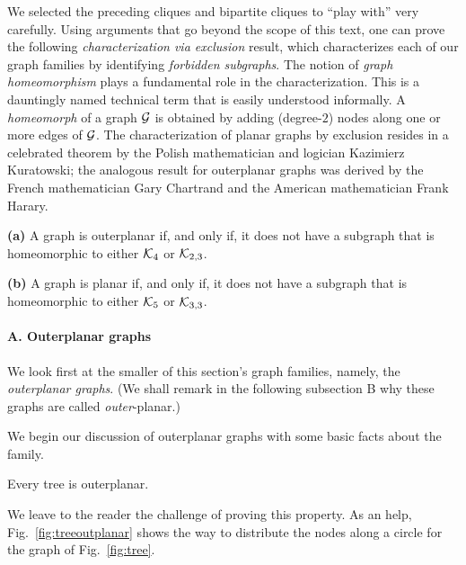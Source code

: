 We selected the preceding cliques and bipartite cliques to ``play
with'' very carefully.  Using arguments that go beyond the scope of
this text, one can prove the following {\em characterization via
  exclusion} result, which characterizes each of our graph families by
identifying {\it forbidden subgraphs}.  
 The
notion of {\it graph homeomorphism} plays a fundamental role in
 the characterization.  This is a
dauntingly named technical term that is easily understood informally.
A {\it homeomorph}  of a graph $\mbox{$\cal G$}$ is
obtained by adding (degree-$2$) nodes along one or more edges of $\mbox{$\cal G$}$.
The characterization of planar graphs by exclusion resides in a
celebrated theorem by the Polish mathematician and logician Kazimierz
Kuratowski;  the analogous result for
outerplanar graphs was derived by the French mathematician Gary
Chartrand  and the American mathematician Frank
Harary. 

\begin{theorem}
\label{thm:planar+outerplanar-exclusion}
{\bf (a)} {\rm \cite{ChartrandB67}}
A graph is outerplanar if, and only if, it does not have a subgraph
that is homeomorphic to either $\mbox{$\cal K$}_4$ or $\mbox{$\cal K$}_{2,3}$.

{\bf (b)} {\rm \cite{Kuratowski30}}
A graph is planar if, and only if, it does not have a subgraph
that is homeomorphic to either $\mbox{$\cal K$}_5$ or $\mbox{$\cal K$}_{3,3}$.
\end{theorem}


\paragraph{\small\sf A. Outerplanar graphs}

We look first at the smaller of this section's graph families, namely,
the {\it outerplanar graphs}. 
 (We shall remark in the following subsection B why these
graphs are called {\em outer}-planar.)

We begin our discussion of outerplanar graphs with some basic facts
about the family.

\begin{prop}
Every tree is outerplanar.
\end{prop}

We leave to the reader the challenge of proving this property. 
As an help, Fig.~\ref{fig:treeoutplanar} shows the way to distribute the nodes along a circle for the graph of Fig.~\ref{fig:tree}.

